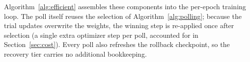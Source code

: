 \documentclass[conference]{IEEEtran}
\begin{document}
\begin{table}[htbp]
\caption{Efficient Polling Configuration}
\begin{center}
\end{center}
\label{tab:config}
\end{table}

Algorithm~\ref{alg:efficient} assembles these components into the per-epoch training loop. The poll itself reuses the selection of Algorithm~\ref{alg:polling}; because the trial updates overwrite the weights, the winning step is re-applied once after selection (a single extra optimizer step per poll, accounted for in Section~\ref{sec:cost}). Every poll also refreshes the rollback checkpoint, so the recovery tier carries no additional bookkeeping.
\end{document}
